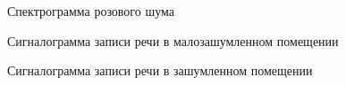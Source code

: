\documentclass{beamer}
\begin{document}
\begin{frame}
  \begin{block}{Спектрограмма розового шума}
  \end{block}
\end{frame}

\begin{frame}
  \begin{block}{Сигналограмма записи речи в малозашумленном помещении}
  \end{block}
\end{frame}


\begin{frame}
  \begin{block}{Сигналограмма записи речи в зашумленном помещении}
  \end{block}
\end{frame}
\end{document}
